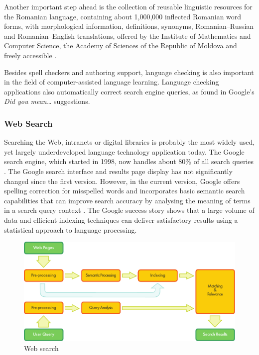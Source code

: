 \begin{multicols}{2}
Another important step ahead is the collection of reusable linguistic resources for the Romanian language, containing about 1,000,000 inflected Romanian word forms, with morphological information, definitions, synonyms, Romanian--Russian and Romanian--English  translations, offered by the Institute of Mathematics and Computer Science, the Academy of Sciences of the Republic of Moldova and freely accessible \cite{elrr}.

Besides spell checkers and authoring support, language checking is also important in the field of computer-assisted language learning. Language checking applications also automatically correct search engine queries, as found in Google's \textit{Did you mean…} suggestions.

\subsubsection{Web Search}

Searching the Web, intranets or digital libraries is probably the most widely used, yet largely underdeveloped language technology application today. The Google search engine, which started in 1998, now handles about 80\% of all search queries \cite{spi1}. The Google search interface and results page display has not significantly changed since the first version. However, in the current version, Google offers spelling correction for misspelled words and incorporates basic semantic search capabilities that can improve search accuracy by analysing the meaning of terms in a search query context \cite{pc1}. The Google success story shows that a large volume of data and efficient indexing techniques can deliver satisfactory results using a statistical approach to language processing. 

\begin{figure}[htb]
  \center
  \includegraphics[width=\textwidth]{../_media/english/web_search_architecture}
  \caption{Web search}
  \label{fig:websearcharch_en}
  \vspace{-15mm}
 \end{figure}


\end{multicols}
